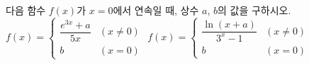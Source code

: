 다음 함수 $f(x)$가 $x=0$에서 연속일 때, 상수 $a$, $b$의 값을 구하시오.
 $f(x)=\begin{cases} \dfrac{e^{3x}+a}{5x} & (x\ne 0) \\ b & (x=0) \end{cases}$
 $f(x)=\begin{cases} \dfrac{\ln(x+a)}{3^x-1} & (x\ne 0) \\ b & (x=0) \end{cases}$

